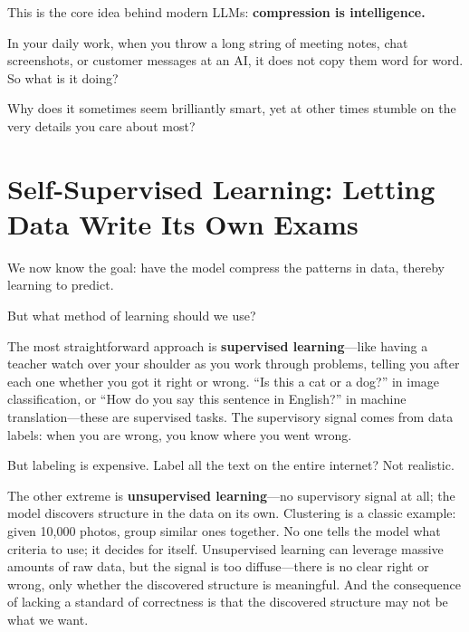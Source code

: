 This is the core idea behind modern LLMs: \textbf{compression is intelligence.}

\begin{thinkbox}
In your daily work, when you throw a long string of meeting notes, chat screenshots, or customer messages at an AI, it does not copy them word for word. So what is it doing?

Why does it sometimes seem brilliantly smart, yet at other times stumble on the very details you care about most?

\end{thinkbox}

\newpage
\section{Self-Supervised Learning: Letting Data Write Its Own Exams}

We now know the goal: have the model compress the patterns in data, thereby learning to predict.

But what method of learning should we use?

\vspace{1em}

The most straightforward approach is \textbf{supervised learning}---like having a teacher watch over your shoulder as you work through problems, telling you after each one whether you got it right or wrong. ``Is this a cat or a dog?'' in image classification, or ``How do you say this sentence in English?'' in machine translation---these are supervised tasks. The supervisory signal comes from data labels: when you are wrong, you know where you went wrong.

But labeling is expensive. Label all the text on the entire internet? Not realistic.

\vspace{1em}

The other extreme is \textbf{unsupervised learning}---no supervisory signal at all; the model discovers structure in the data on its own. Clustering is a classic example: given 10,000 photos, group similar ones together. No one tells the model what criteria to use; it decides for itself. Unsupervised learning can leverage massive amounts of raw data, but the signal is too diffuse---there is no clear right or wrong, only whether the discovered structure is meaningful. And the consequence of lacking a standard of correctness is that the discovered structure may not be what we want.

\vspace{1em}

